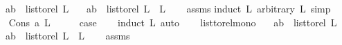 \begin{isabellebody}
\ \ \ {\isachardoublequoteopen}{\isacharparenleft}{\kern0pt}a{\isacharcomma}{\kern0pt}b{\isacharparenright}{\kern0pt}\ {\isasymin}\ list{\isacharunderscore}{\kern0pt}to{\isacharunderscore}{\kern0pt}rel\ {\isacharparenleft}{\kern0pt}L{\isacharparenright}{\kern0pt}{\isachardoublequoteclose}\isanewline
\ \ \ {\isachardoublequoteopen}{\isacharparenleft}{\kern0pt}a{\isacharcomma}{\kern0pt}b{\isacharparenright}{\kern0pt}\ {\isasymin}\ list{\isacharunderscore}{\kern0pt}to{\isacharunderscore}{\kern0pt}rel\ {\isacharparenleft}{\kern0pt}L\ {\isacharat}{\kern0pt}\ L{}{\isacharparenright}{\kern0pt}{\isachardoublequoteclose}\isanewline
%
\isadelimproof
\ \ %
\endisadelimproof
%
\isatagproof
{}\isamarkupfalse%
\ assms\isanewline
{}\isamarkupfalse%
{\isacharparenleft}{\kern0pt}induct\ L{}\ arbitrary{\isacharcolon}{\kern0pt}\ L{\isacharcomma}{\kern0pt}\ simp{\isacharparenright}{\kern0pt}\isanewline
\ \ \isamarkupfalse%
\ {\isacharparenleft}{\kern0pt}Cons\ a\ L{}{\isacharparenright}{\kern0pt}\isanewline
\ \ \isamarkupfalse%
\ \isamarkupfalse%
\ {\isacharquery}{\kern0pt}case\ \isanewline
\ \ \isamarkupfalse%
{\isacharparenleft}{\kern0pt}induct\ L{\isacharcomma}{\kern0pt}\ auto{\isacharparenright}{\kern0pt}\isanewline
\ \ \isamarkupfalse%
\isanewline
{}\isamarkupfalse%
%
\endisatagproof
{\isafoldproof}%
%
\isadelimproof
\isanewline
%
\endisadelimproof
\isanewline
{}\isamarkupfalse%
\ list{\isacharunderscore}{\kern0pt}to{\isacharunderscore}{\kern0pt}rel{\isacharunderscore}{\kern0pt}mono{}{\isacharcolon}{\kern0pt}\isanewline
\ \ \ {\isachardoublequoteopen}{\isacharparenleft}{\kern0pt}a{\isacharcomma}{\kern0pt}b{\isacharparenright}{\kern0pt}\ {\isasymin}\ list{\isacharunderscore}{\kern0pt}to{\isacharunderscore}{\kern0pt}rel\ {\isacharparenleft}{\kern0pt}L{}{\isacharparenright}{\kern0pt}{\isachardoublequoteclose}\isanewline
\ \ \ {\isachardoublequoteopen}{\isacharparenleft}{\kern0pt}a{\isacharcomma}{\kern0pt}b{\isacharparenright}{\kern0pt}\ {\isasymin}\ list{\isacharunderscore}{\kern0pt}to{\isacharunderscore}{\kern0pt}rel\ {\isacharparenleft}{\kern0pt}L\ {\isacharat}{\kern0pt}\ L{}{\isacharparenright}{\kern0pt}{\isachardoublequoteclose}\isanewline
%
\isadelimproof
\ \ %
\endisadelimproof
%
\isatagproof
{}\isamarkupfalse%
\ assms\isanewline
{}\isamarkupfalse%

\end{isabellebody}
